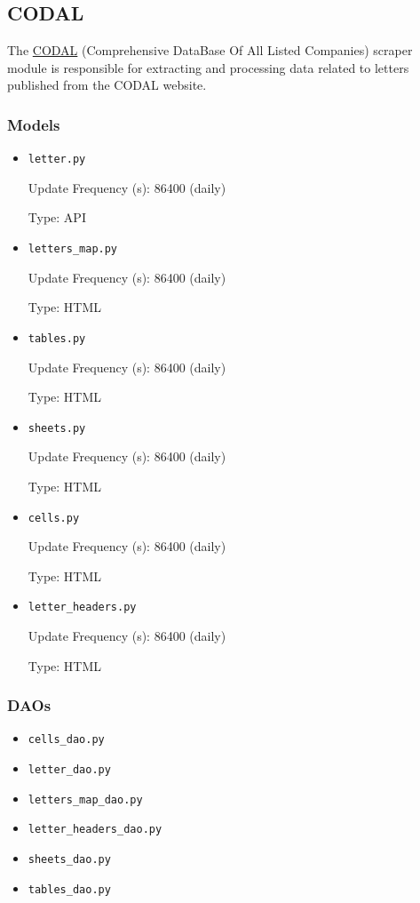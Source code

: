 	\newpage
	\subsection{CODAL}
	The \hyperlink{https://www.codal.ir/}{CODAL} (Comprehensive DataBase Of All Listed Companies) scraper module is responsible for extracting and processing data related to letters published from the CODAL website.

	\subsubsection{Models}

	\begin{itemize}

		\item \texttt{letter.py}

		Update Frequency (s): 86400 (daily)

		Type: API

		\item \texttt{letters\_map.py}

		Update Frequency (s): 86400 (daily)

		Type: HTML

		\item \texttt{tables.py}

		Update Frequency (s): 86400 (daily)

		Type: HTML

		\item \texttt{sheets.py}

		Update Frequency (s): 86400 (daily)

		Type: HTML

		\item \texttt{cells.py}

		Update Frequency (s): 86400 (daily)

		Type: HTML

		\item \texttt{letter\_headers.py}

		Update Frequency (s): 86400 (daily)

		Type: HTML

	\end{itemize}

	\subsubsection{DAOs}

	\begin{itemize}
	\item \texttt{cells\_dao.py}


	\item \texttt{letter\_dao.py}


	\item \texttt{letters\_map\_dao.py}


	\item \texttt{letter\_headers\_dao.py}


	\item \texttt{sheets\_dao.py}


	\item \texttt{tables\_dao.py}

	\end{itemize}

